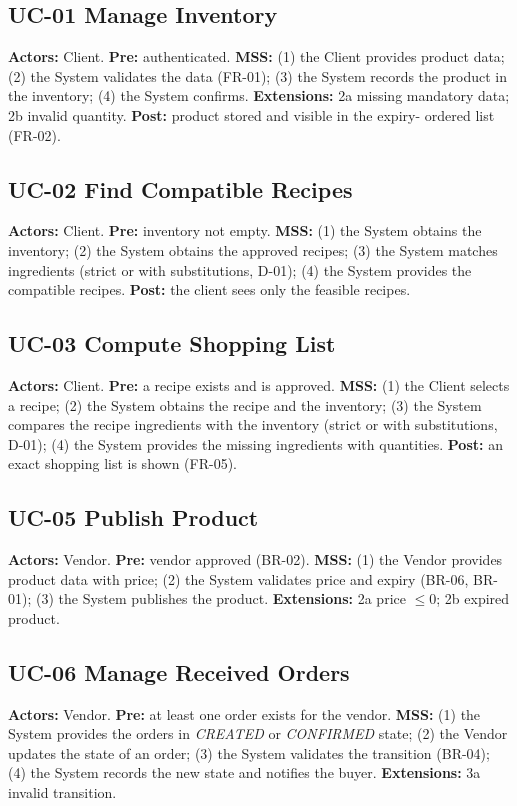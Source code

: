 \subsection*{UC-01 Manage Inventory}
\textbf{Actors:} Client. \textbf{Pre:} authenticated.
\textbf{MSS:} (1) the Client provides product data; (2) the System validates
the data (FR-01); (3) the System records the product in the inventory;
(4) the System confirms. \textbf{Extensions:} 2a missing mandatory data; 2b
invalid quantity. \textbf{Post:} product stored and visible in the expiry-
ordered list (FR-02).

\subsection*{UC-02 Find Compatible Recipes}
\textbf{Actors:} Client. \textbf{Pre:} inventory not empty.
\textbf{MSS:} (1) the System obtains the inventory; (2) the System obtains
the approved recipes; (3) the System matches ingredients (strict or with
substitutions, D-01); (4) the System provides the compatible recipes.
\textbf{Post:} the client sees only the feasible recipes.

\subsection*{UC-03 Compute Shopping List}
\textbf{Actors:} Client. \textbf{Pre:} a recipe exists and is approved.
\textbf{MSS:} (1) the Client selects a recipe; (2) the System obtains the
recipe and the inventory; (3) the System compares the recipe ingredients
with the inventory (strict or with substitutions, D-01); (4) the System provides the missing ingredients with quantities. \textbf{Post:} an exact shopping list is shown
(FR-05).

\subsection*{UC-05 Publish Product}
\textbf{Actors:} Vendor. \textbf{Pre:} vendor approved (BR-02).
\textbf{MSS:} (1) the Vendor provides product data with price; (2) the System
validates price and expiry (BR-06, BR-01); (3) the System publishes the
product. \textbf{Extensions:} 2a price $\leq 0$; 2b expired product.

\subsection*{UC-06 Manage Received Orders}
\textbf{Actors:} Vendor. \textbf{Pre:} at least one order exists for the
vendor. \textbf{MSS:} (1) the System provides the orders in \emph{CREATED} or
\emph{CONFIRMED} state; (2) the Vendor updates the state of an order;
(3) the System validates the transition (BR-04); (4) the System records the new state and notifies the buyer. \textbf{Extensions:} 3a invalid transition.

